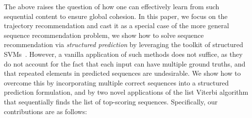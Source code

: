 The above raises the question of how one can effectively learn from such sequential content to ensure global cohesion.
In this paper, we focus on the trajectory recommendation and cast it as a special case of the more general sequence recommendation problem,
we show how to solve sequence recommendation via \emph{structured prediction} by leveraging the toolkit of structured SVMs~\citep{taskar2004max,tsochantaridis2004support}.
However, a vanilla application of such methods does not suffice,
as they do not account for the fact that each input can have multiple ground truths,
and that repeated elements in predicted sequences are undesirable.
We show how to overcome this by
incorporating multiple correct sequences into a structured prediction formulation,
and by two novel applications of the list Viterbi algorithm that sequentially finds the list of top-scoring sequences.
Specifically, our contributions are as follows:
